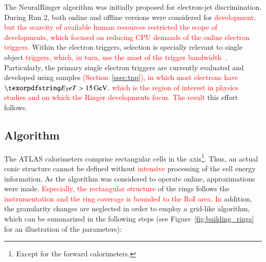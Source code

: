 
The NeuralRinger algorithm was initially proposed for electron-jet discrimination. 
During Run 2, both online and offline versions
were considered for \textcolor{red}{ development, but the scarcity of available human resources restricted the scope of developments, which focused on reducing CPU demands of the online electron triggers.} Within the electron triggers, \hlt{} selection is
specially relevant to single object \textcolor{red}{triggers, which, in turn, use the most of the trigger bandwidth}~\cite{aad2020performance}. Particularly, the primary single electron triggers
are currently evaluated and developed using \Zee{} \tnp{} samples 
\textcolor{red}{(Section~\ref{ssec:tnp}), in which most electrons have $\et>\SI{15}{\GeV}$, which is the region of interest in physics studies and on which the Ringer developments focus. The result} this effort
follows.



\subsection{\fastcalo Algorithm}\label{top:algorithm}

The ATLAS calorimeters comprise rectangular cells in the
\etaphi axis\footnote{Except for the forward calorimeters.}. Thus, an actual conic structure cannot be defined
without \textcolor{red}{intensive} processing of the cell energy information. As the algorithm was
considered to operate online, approximations were made. \textcolor{red}{Especially, the rectangular structure} of
the rings follows the \textcolor{red}{instrumentation and the ring coverage is bounded to the RoI area. In} addition, the granularity changes are neglected in order to employ a
grid-like algorithm, which can be summarized in the following steps (see
Figure~\ref{fig:building_rings} for an illustration of the parameters):

